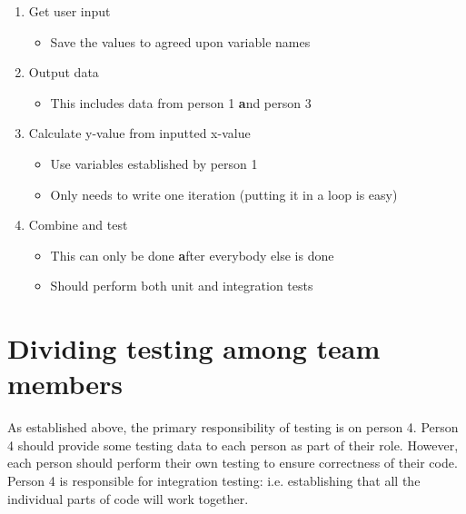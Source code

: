 \documentclass{article}
\begin{document}
\begin{enumerate}
	\item Get user input
		\begin{itemize}
			\item Save the values to agreed upon variable names
		\end{itemize}
	\item Output data
		\begin{itemize}
			\item This includes data from person 1 {\textbf and} person 3
		\end{itemize}
	\item Calculate y-value from inputted x-value
		\begin{itemize}
			\item Use variables established by person 1
			\item Only needs to write one iteration (putting it in a loop is easy)
		\end{itemize}
	\item Combine and test
		\begin{itemize}
			\item This can only be done {\textbf after} everybody else is done
			\item Should perform both unit and integration tests
		\end{itemize}
\end{enumerate}

\section{Dividing testing among team members}

As established above, the primary responsibility of testing is on person 4.
Person 4 should provide some testing data to each person as part of their role.
However, each person should perform their own testing to ensure correctness of
their code. Person 4 is responsible for integration testing: i.e. establishing
that all the individual parts of code will work together. 
\end{document}
